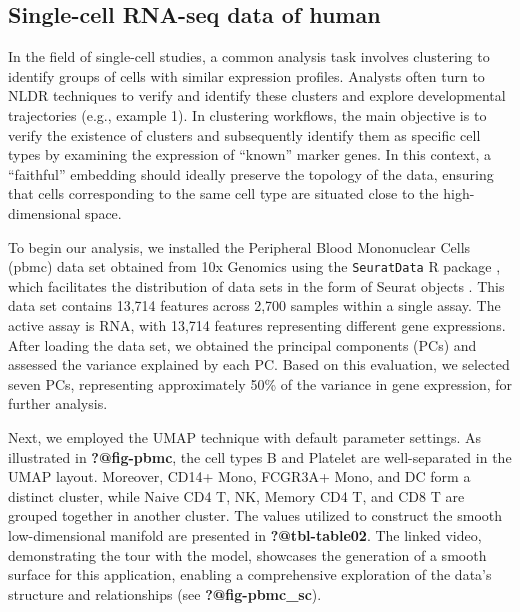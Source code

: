 \documentclass[
  12pt]{article}
\begin{document}
\hypertarget{single-cell-rna-seq-data-of-human}{%
\subsection{Single-cell RNA-seq data of
human}\label{single-cell-rna-seq-data-of-human}}

In the field of single-cell studies, a common analysis task involves
clustering to identify groups of cells with similar expression profiles.
Analysts often turn to NLDR techniques to verify and identify these
clusters and explore developmental trajectories (e.g., example 1). In
clustering workflows, the main objective is to verify the existence of
clusters and subsequently identify them as specific cell types by
examining the expression of ``known'' marker genes. In this context, a
``faithful'' embedding should ideally preserve the topology of the data,
ensuring that cells corresponding to the same cell type are situated
close to the high-dimensional space.

To begin our analysis, we installed the Peripheral Blood Mononuclear
Cells (pbmc) data set obtained from 10x Genomics using the
\texttt{SeuratData} R package \citep{Rahul2019}, which facilitates the
distribution of data sets in the form of Seurat objects
\citep{Yuhan2021}. This data set contains 13,714 features across 2,700
samples within a single assay. The active assay is RNA, with 13,714
features representing different gene expressions. After loading the data
set, we obtained the principal components (PCs) and assessed the
variance explained by each PC. Based on this evaluation, we selected
seven PCs, representing approximately 50\% of the variance in gene
expression, for further analysis.

Next, we employed the UMAP technique with default parameter settings. As
illustrated in \textbf{?@fig-pbmc}, the cell types B and Platelet are
well-separated in the UMAP layout. Moreover, CD14+ Mono, FCGR3A+ Mono,
and DC form a distinct cluster, while Naive CD4 T, NK, Memory CD4 T, and
CD8 T are grouped together in another cluster. The values utilized to
construct the smooth low-dimensional manifold are presented in
\textbf{?@tbl-table02}. The linked video, demonstrating the tour with
the model, showcases the generation of a smooth surface for this
application, enabling a comprehensive exploration of the data's
structure and relationships (see \textbf{?@fig-pbmc\_sc}).
\end{document}
